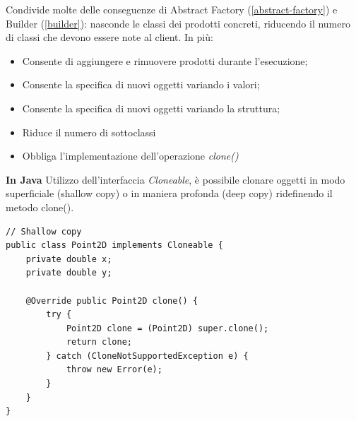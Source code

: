 Condivide molte delle conseguenze di Abstract Factory (\ref{abstract-factory}) e Builder (\ref{builder}): nasconde le classi dei prodotti concreti, riducendo il numero di classi che devono essere note al client. In più:
\begin{itemize}
    \item Consente di aggiungere e rimuovere prodotti durante l’esecuzione;
    \item Consente la specifica di nuovi oggetti variando i valori;
    \item Consente la specifica di nuovi oggetti variando la struttura;
    \item Riduce il numero di sottoclassi
    \item Obbliga l'implementazione dell’operazione \textit{clone()}
\end{itemize}

\textbf{In Java}
Utilizzo dell'interfaccia \textit{Cloneable}, è possibile clonare oggetti in modo superficiale (shallow copy) o in maniera profonda (deep copy) ridefinendo il metodo clone().

\begin{verbatim}
// Shallow copy
public class Point2D implements Cloneable {
    private double x; 
    private double y;
    
    @Override public Point2D clone() { 
        try { 
            Point2D clone = (Point2D) super.clone(); 
            return clone;
        } catch (CloneNotSupportedException e) {
            throw new Error(e);
        } 
    } 
}
\end{verbatim}

\newpage

